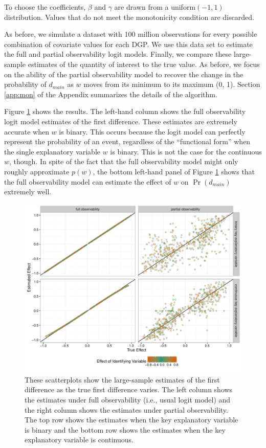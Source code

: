 \documentclass[10pt]{article}
\begin{document}
\noindent To choose the coefficients, $\beta$ and $\gamma$ are drawn from a uniform$(-1, 1)$ distribution. 
Values that do not meet the monotonicity condition are discarded.

As before, we simulate a dataset with 100 million observations for every possible combination of covariate values for each DGP. 
We use this data set to estimate the full and partial observability logit models.
Finally, we compare these large-sample estimates of the quantity of interest to the true value.
As before, we focus on the ability of the partial observability model to recover the change in the probability of $d_{main}$ as $w$ moves from its minimum to its maximum (0, 1). Section \ref{app:mon} of the Appendix summarizes the details of the algorithm.

Figure \ref{fig:mon-sims} shows the results. 
The left-hand column shows the full observability logit model estimates of the first difference. 
These estimates are extremely accurate when $w$ is binary. 
This occurs because the logit model can perfectly represent the probability of an event, regardless of the ``functional form'' when the single explanatory variable $w$ is binary. 
This is not the case for the continuous $w$, though. 
In spite of the fact that the full observability model might only roughly approximate $p(w)$, the bottom left-hand panel of Figure \ref{fig:mon-sims} shows that the full observability model can estimate the effect of $w$ on $\Pr(d_{main})$ extremely well.

\begin{figure}[H]
\begin{center}
\includegraphics[scale = 0.6]{figs/mon-sims-scatter.pdf}
\caption{These scatterplots show the large-sample estimates of the first difference as the true first difference varies. The left column shows the estimates under full observability (i.e., usual logit model) and the right column shows the estimates under partial observability. The top row shows the estimates when the key explanatory variable is binary and the bottom row shows the estimates when the key explanatory variable is continuous.}\label{fig:mon-sims}
\end{center}
\end{figure}
\end{document}
